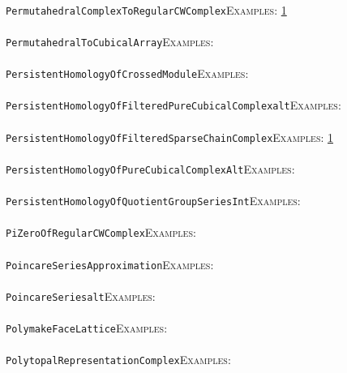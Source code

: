 \documentclass[a4paper,11pt]{report}
\begin{document}
{{ \\
 \texttt{PermutahedralComplexToRegularCWComplex}{\nobreakspace}{\nobreakspace}{\nobreakspace}{\nobreakspace}\textsc{Examples:} \href{../www/SideLinks/About/aboutPeripheral.html} {1}{\nobreakspace} \\
 \\
 \texttt{PermutahedralToCubicalArray}{\nobreakspace}{\nobreakspace}{\nobreakspace}{\nobreakspace}\textsc{Examples:} \\
 \\
 \texttt{PersistentHomologyOfCrossedModule}{\nobreakspace}{\nobreakspace}{\nobreakspace}{\nobreakspace}\textsc{Examples:} \\
 \\
 \texttt{PersistentHomologyOfFilteredPureCubicalComplex{\textunderscore}alt}{\nobreakspace}{\nobreakspace}{\nobreakspace}{\nobreakspace}\textsc{Examples:} \\
 \\
 \texttt{PersistentHomologyOfFilteredSparseChainComplex}{\nobreakspace}{\nobreakspace}{\nobreakspace}{\nobreakspace}\textsc{Examples:} \href{../www/SideLinks/About/aboutPersistent.html} {1}{\nobreakspace} \\
 \\
 \texttt{PersistentHomologyOfPureCubicalComplex{\textunderscore}Alt}{\nobreakspace}{\nobreakspace}{\nobreakspace}{\nobreakspace}\textsc{Examples:} \\
 \\
 \texttt{PersistentHomologyOfQuotientGroupSeries{\textunderscore}Int}{\nobreakspace}{\nobreakspace}{\nobreakspace}{\nobreakspace}\textsc{Examples:} \\
 \\
 \texttt{PiZeroOfRegularCWComplex}{\nobreakspace}{\nobreakspace}{\nobreakspace}{\nobreakspace}\textsc{Examples:} \\
 \\
 \texttt{PoincareSeriesApproximation}{\nobreakspace}{\nobreakspace}{\nobreakspace}{\nobreakspace}\textsc{Examples:} \\
 \\
 \texttt{PoincareSeries{\textunderscore}alt}{\nobreakspace}{\nobreakspace}{\nobreakspace}{\nobreakspace}\textsc{Examples:} \\
 \\
 \texttt{PolymakeFaceLattice}{\nobreakspace}{\nobreakspace}{\nobreakspace}{\nobreakspace}\textsc{Examples:} \\
 \\
 \texttt{PolytopalRepresentationComplex}{\nobreakspace}{\nobreakspace}{\nobreakspace}{\nobreakspace}\textsc{Examples:} \\
}}
\end{document}
